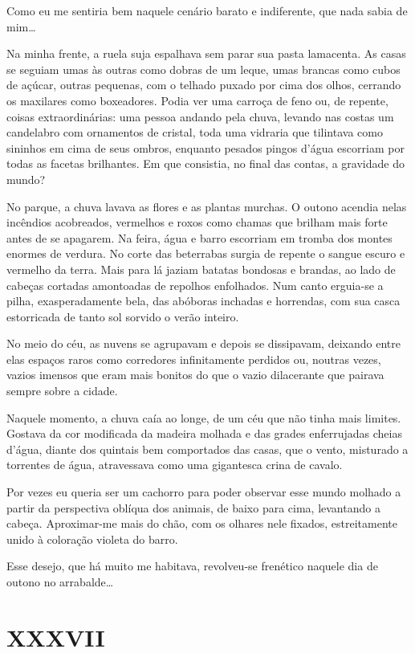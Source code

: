Como eu me sentiria bem naquele cenário barato e indiferente, que nada sabia de mim\dots

Na minha frente, a ruela suja espalhava sem parar sua pasta lamacenta. As casas se seguiam umas às outras como dobras de um leque, umas brancas como cubos de açúcar, outras pequenas, com o telhado puxado por cima dos olhos, cerrando os maxilares como boxeadores. Podia ver uma carroça de feno ou, de repente, coisas extraordinárias: uma pessoa andando pela chuva, levando nas costas um candelabro com ornamentos de cristal, toda uma vidraria que tilintava como sininhos em cima de seus ombros, enquanto pesados pingos d’água escorriam por todas as facetas brilhantes. Em que consistia, no final das contas, a gravidade do mundo?

No parque, a chuva lavava as flores e as plantas murchas. O outono acendia nelas incêndios acobreados, vermelhos e roxos como chamas que brilham mais forte antes de se apagarem. Na feira, água e barro escorriam em tromba dos montes enormes de verdura. No corte das beterrabas surgia de repente o sangue escuro e vermelho da terra. Mais para lá jaziam batatas bondosas e brandas, ao lado de cabeças cortadas amontoadas de repolhos enfolhados. Num canto erguia-se a pilha, exasperadamente bela, das abóboras inchadas e horrendas, com sua casca estorricada de tanto sol sorvido o verão inteiro.

No meio do céu, as nuvens se agrupavam e depois se dissipavam, deixando entre elas espaços raros como corredores infinitamente perdidos ou, noutras vezes, vazios imensos que eram mais bonitos do que o vazio dilacerante que pairava sempre sobre a cidade.

Naquele momento, a chuva caía ao longe, de um céu que não tinha mais limites. Gostava da cor modificada da madeira molhada e das grades enferrujadas cheias d’água, diante dos quintais bem comportados das casas, que o vento, misturado a torrentes de água, atravessava como uma gigantesca crina de cavalo.

Por vezes eu queria ser um cachorro para poder observar esse mundo molhado a partir da perspectiva oblíqua dos animais, de baixo para cima, levantando a cabeça. Aproximar-me mais do chão, com os olhares nele fixados, estreitamente unido à coloração violeta do barro.

Esse desejo, que há muito me habitava, revolveu-se frenético naquele dia de outono no arrabalde\dots


\chapter*{\centering\Large{XXXVII}}

